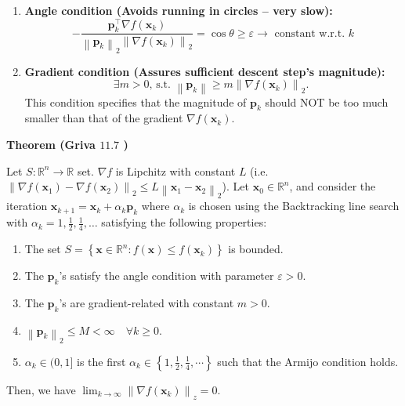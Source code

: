 \documentclass[11pt]{article}
\theoremstyle{plain} %
\newenvironment{topic}
{\color{C2}\normalfont\begin{framed}\begingroup }
  {\endgroup\end{framed}}
\theoremstyle{remark}
\begin{document}
\begin{topic}
\begin{enumerate}
    \item \textbf{Angle condition (Avoids running in circles -- very slow):}
          \[
            -\frac{\mathbf{p}_k^{\top} \nabla f\left(\mathbf{x}_k\right)}{\left\|\mathbf{p}_k\right\|_2\left\|\nabla f\left(\mathbf{x}_k\right)\right\|_2} = \cos{\theta}\geqslant \varepsilon \longrightarrow \text { constant w.r.t. } k
          \]

    \item \textbf{Gradient condition (Assures sufficient descent step's magnitude):}
          \[
            \exists m>0 \text {, s.t. }\left\|\mathbf{p}_k\right\| \geqslant m\left\|\nabla f\left(\mathbf{x}_k\right)\right\|_2 \text {. }
          \]
          This condition specifies that the magnitude of $\mathbf{p}_k$ should NOT be too much smaller than that of the gradient $\nabla f\left(\mathbf{x}_k\right)$.
  \end{enumerate}

  \textbf{Theorem (Griva $11.7$ )}

  Let $S: \mathbb{R}^n \rightarrow \mathbb{R}$ set. $\nabla f$ is Lipchitz with constant $L$ (i.e. $\left\|\nabla f\left(\mathbf{x}_1\right)-\nabla f\left(\mathbf{x}_2\right)\right\|_2 \le L\left\|\mathbf{x}_1-\mathbf{x}_2\right\|_2$).
  Let $\mathbf{x}_0 \in \mathbb{R}^n$, and consider the iteration $\mathbf{x}_{k+1}=\mathbf{x}_k+\alpha_k \mathbf{p}_k$ where $\alpha_k$ is chosen using the Backtracking line search with $\alpha_k=1, \frac{1}{2}, \frac{1}{4}, \ldots$ satisfying the following properties:
  \begin{enumerate}
    \item The set $S=\left\{\mathbf{x} \in \mathbb{R}^n: f(\mathbf{x}) \leqslant f\left(\mathbf{x}_k\right)\right\}$ is bounded.
    \item The $\mathbf{p}_k$'s satisfy the angle condition with parameter $\varepsilon>0$.
    \item The $\mathbf{p}_k$'s are gradient-related with constant $m>0$.
    \item $\left\|\mathbf{p}_k\right\|_2 \leq M<\infty \quad \forall k \geq 0$.
    \item $\alpha_k \in(0,1]$ is the first $\alpha_k \in\left\{1, \frac{1}{2}, \frac{1}{4}, \cdots\right\}$ such that the Armijo condition holds.
  \end{enumerate}
  Then, we have $\lim _{k \rightarrow \infty}\left\|\nabla f\left(\mathbf{x}_k\right)\right\|_z=0$.

\end{topic}
\end{document}
